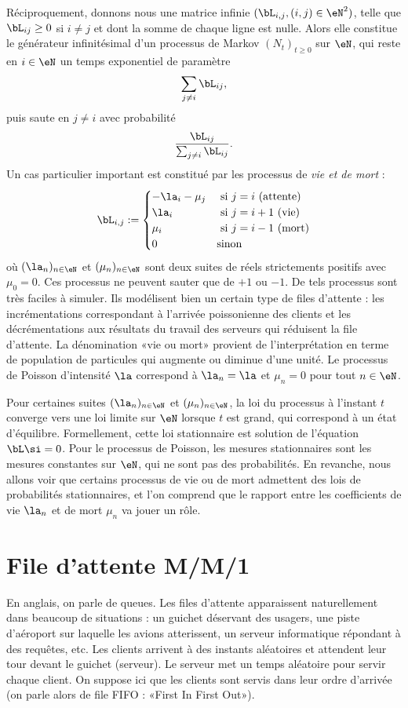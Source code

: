 Réciproquement, donnons nous une matrice infinie $(\bL_{i,j},(i,j)\in\eN^2)$,
telle que $\bL_{ij}\geq 0$ si $i\neq j$ et dont la somme de chaque ligne est
nulle. Alors elle constitue le générateur infinitésimal d'un processus de
Markov $(N_t)_{t\geq 0}$ sur $\eN$, qui reste en $i\in\eN$ un temps
exponentiel de paramètre
$$
\sum_{j\neq i}\bL_{ij},
$$
puis saute en $j\neq i$ avec probabilité
$$
\frac{\bL_{ij}}{\sum_{j\neq i}\bL_{ij}}.
$$
Un cas particulier important est constitué par les processus de \emph{vie
  et de mort} :
$$
\bL_{i,j}:=
\begin{cases}
  -\la_{i}-\mu_j & \text{ si $j=i$ (attente)} \\
  \la_{i} & \text{ si $j=i+1$ (vie)} \\
  \mu_{i} & \text{ si $j=i-1$ (mort)} \\
  0 & \text{sinon}
\end{cases}
$$
où $(\la_n)_{n\in\eN}$ et $(\mu_n)_{n\in\eN}$ sont deux suites de réels
strictements positifs avec $\mu_0=0$. Ces processus ne peuvent sauter que de
$+1$ ou $-1$. De tels processus sont très faciles à simuler. Ils modélisent
bien un certain type de files d'attente : les incrémentations correspondant à
l'arrivée poissonienne des clients et les décrémentations aux résultats du
travail des serveurs qui réduisent la file d'attente.  La dénomination «vie ou
mort» provient de l'interprétation en terme de population de particules qui
augmente ou diminue d'une unité. Le processus de Poisson d'intensité $\la$
correspond à $\la_n=\la$ et $\mu_n=0$ pour tout $n\in\eN$.

Pour certaines suites $(\la_n)_{n\in\eN}$ et $(\mu_n)_{n\in\eN}$, la loi du
processus à l'instant $t$ converge vers une loi limite sur $\eN$ lorsque $t$
est grand, qui correspond à un état d'équilibre. Formellement, cette loi
stationnaire est solution de l'équation $\bL\si=0$. Pour le processus de
Poisson, les mesures stationnaires sont les mesures constantes sur $\eN$, qui
ne sont pas des probabilités. En revanche, nous allons voir que certains
processus de vie ou de mort admettent des lois de probabilités stationnaires,
et l'on comprend que le rapport entre les coefficients de vie $\la_n$ et de
mort $\mu_n$ va jouer un rôle.

%
\section{File d'attente M/M/1}
%

En anglais, on parle de queues. Les files d'attente apparaissent naturellement
dans beaucoup de situations : un guichet déservant des usagers, une piste
d'aéroport sur laquelle les avions atterissent, un serveur informatique
répondant à des requêtes, etc.  Les clients arrivent à des instants aléatoires
et attendent leur tour devant le guichet (serveur). Le serveur met un temps
aléatoire pour servir chaque client.  On suppose ici que les clients sont
servis dans leur ordre d'arrivée (on parle alors de file FIFO : «First In
First Out»).

